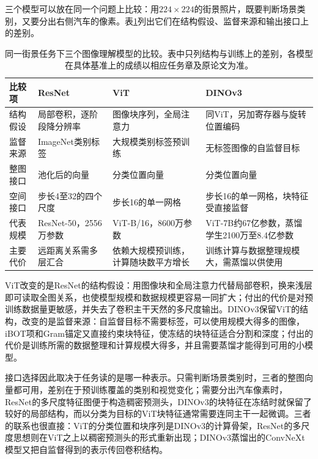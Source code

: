 三个模型可以放在同一个问题上比较：用$224\times224$的街景照片，既要判断场景类别，又要分出右侧汽车的像素。表\ref{tab:vision-ivm-image-models}列出它们在结构假设、监督来源和输出接口上的差别。

\begin{table}[htbp]
  \centering
  \small
  \begin{tabularx}{\linewidth}{@{}p{16mm}XXX@{}}
    \toprule
    比较项 & ResNet & ViT & DINOv3\\
    \midrule
    结构假设 & 局部卷积，逐阶段降分辨率 & 图像块序列，全局注意力 & 同ViT，另加寄存器与旋转位置编码\\
    监督来源 & ImageNet类别标签 & 大规模类别标签预训练 & 无标签图像的自监督目标\\
    整图接口 & 池化后的向量 & 分类位置向量 & 分类位置向量\\
    空间接口 & 步长4至32的四个尺度 & 步长16的单一网格 & 步长16的单一网格，块特征受直接监督\\
    代表规模 & ResNet-50，2556万参数 & ViT-B/16，8600万参数 & ViT-7B约67亿参数，蒸馏学生2100万至8.4亿参数\\
    主要代价 & 远距离关系需多层汇合 & 依赖大规模预训练，计算随块数平方增长 & 训练计算与数据整理规模大，需蒸馏以供使用\\
    \bottomrule
  \end{tabularx}
  \caption{同一街景任务下三个图像理解模型的比较。表中只列结构与训练上的差别，各模型在具体基准上的成绩以相应任务章及原论文为准。}
  \label{tab:vision-ivm-image-models}
\end{table}
\FloatBarrier

ViT改变的是ResNet的结构假设：用图像块和全局注意力代替局部卷积，换来浅层即可读取全图关系，也使模型规模和数据规模更容易一同扩大；付出的代价是对预训练数据量更敏感，并失去了卷积主干天然的多尺度输出。DINOv3保留ViT的结构，改变的是监督来源：自监督目标不需要标签，可以使用规模大得多的图像，iBOT项和Gram锚定又直接约束块特征，使冻结的块特征适合分割和深度；付出的代价是训练所需的数据整理和计算规模大得多，并且需要蒸馏才能得到可用的小模型。

接口选择因此取决于任务读的是哪一种表示。只需判断场景类别时，三者的整图向量都可用，差别在于预训练覆盖的类别和视觉变化；需要分出汽车像素时，ResNet的多尺度特征图便于构造稠密预测头，DINOv3的块特征在冻结时就保留了较好的局部结构，而以分类为目标的ViT块特征通常需要连同主干一起微调。三者的联系也很直接：ViT的分类位置和块序列是DINOv3的计算骨架，ResNet的多尺度思想则在ViT之上以稠密预测头的形式重新出现；DINOv3蒸馏出的ConvNeXt模型又把自监督得到的表示传回卷积结构。

